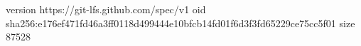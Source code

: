version https://git-lfs.github.com/spec/v1
oid sha256:e176ef471fd46a3ff0118d499444e10bfcb14fd01f6d3f3fd65229ce75cc5f01
size 87528
